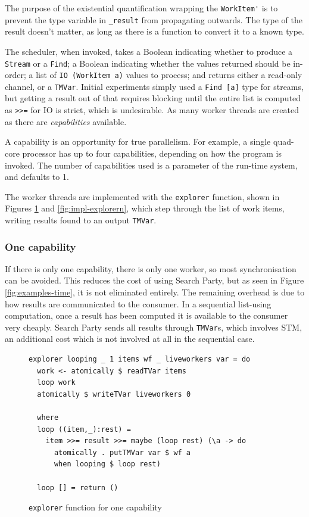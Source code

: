 The purpose of the existential quantification wrapping the
\verb|WorkItem'| is to prevent the type variable in \verb|_result|
from propagating outwards. The type of the result doesn't matter, as
long as there is a function to convert it to a known type.

The scheduler, when invoked, takes a Boolean indicating whether to
produce a \verb|Stream| or a \verb|Find|; a Boolean indicating whether
the values returned should be in-order; a list of
\verb|IO (WorkItem a)| values to process; and returns either a
read-only channel, or a \verb|TMVar|. Initial experiments simply used
a \verb|Find [a]| type for streams, but getting a result out of that
requires blocking until the entire list is computed as \verb|>>=| for
IO is strict, which is undesirable. As many worker threads are created
as there are \textit{capabilities} available.

A capability is an opportunity for true parallelism. For example, a
single quad-core processor has up to four capabilities, depending on
how the program is invoked. The number of capabilities used is a
parameter of the run-time system, and defaults to 1.

The worker threads are implemented with the \verb|explorer| function,
shown in Figures \ref{fig:impl-explorer1} and
\ref{fig:impl-explorern}, which step through the list of work items,
writing results found to an output \verb|TMVar|.

\subsubsection{One capability}
\label{sec:prelims-searchparty-impl-one}

If there is only one capability, there is only one worker, so most
synchronisation can be avoided. This reduces the cost of using Search
Party, but as seen in Figure \ref{fig:examples-time}, it is not
eliminated entirely. The remaining overhead is due to how results are
communicated to the consumer. In a sequential list-using computation,
once a result has been computed it is available to the consumer very
cheaply. Search Party sends all results through \verb|TMVar|s, which
involves STM, an additional cost which is not involved at all in the
sequential case.

\begin{figure}[t]
  \centering
  \begin{verbatim}
explorer looping _ 1 items wf _ liveworkers var = do
  work <- atomically $ readTVar items
  loop work
  atomically $ writeTVar liveworkers 0

  where
  loop ((item,_):rest) =
    item >>= result >>= maybe (loop rest) (\a -> do
      atomically . putTMVar var $ wf a
      when looping $ loop rest)

  loop [] = return ()
  \end{verbatim}
  \caption{\texttt{explorer} function for one capability}
  \label{fig:impl-explorer1}
\end{figure}

